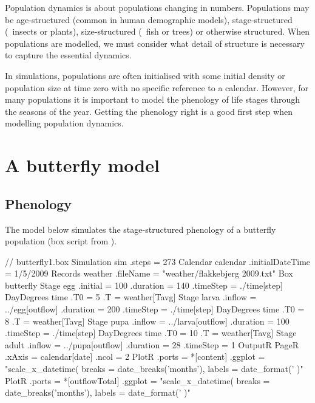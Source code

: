 Population dynamics is about populations changing in numbers. Populations may be age-structured (common in human demographic models), stage-structured (\eg\ insects or plants), size-structured (\eg\ fish or trees) or otherwise structured. When populations are modelled, we must consider what detail of structure is necessary to capture the essential dynamics.

In simulations, populations are often initialised with some initial density or population size at time zero with no specific reference to a calendar. However, for many populations it is important to model the phenology of life stages through the seasons of the year. Getting the phenology right is a good first step when modelling population dynamics.

\section{A butterfly model}
\subsection{Phenology}
The model below simulates the stage-structured phenology of a butterfly population (box script from ).

\lstset{numbers=left}
\begin{boxscript}
// butterfly1.box
Simulation sim {
  .steps = 273
  Calendar calendar {
    .initialDateTime = 1/5/2009
  }
  Records weather {
    .fileName = "weather/flakkebjerg 2009.txt"
  }
  Box butterfly {
    Stage egg {
      .initial = 100 
      .duration = 140
      .timeStep = ./time[step]
      DayDegrees time {
        .T0 = 5
        .T = weather[Tavg]
      }
    }
    Stage larva {
      .inflow = ../egg[outflow]
      .duration = 200
      .timeStep = ./time[step]
      DayDegrees time {
        .T0 = 8
        .T = weather[Tavg]
      }
    }
    Stage pupa {
      .inflow = ../larva[outflow]
      .duration = 100
      .timeStep = ./time[step]
      DayDegrees time {
        .T0 = 10
        .T = weather[Tavg]
      }
    }
    Stage adult {
      .inflow = ../pupa[outflow]
      .duration = 28
      .timeStep = 1
    }
  }
  OutputR {
    PageR {
      .xAxis = calendar[date]
      .ncol = 2
      PlotR {
        .ports = *[content]
        .ggplot = "scale_x_datetime(
                     breaks = date_breaks('months'), 
                     labels = date_format('%
                   )" 
      }
      PlotR {
        .ports = *[outflowTotal]
        .ggplot = "scale_x_datetime(
                     breaks = date_breaks('months'), 
                     labels = date_format('%
                   )" 
      }
    }
  }
}
\end{boxscript}
\lstset{numbers=none}

